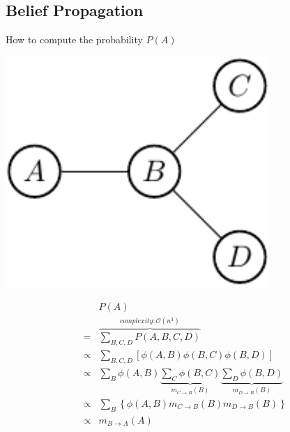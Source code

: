 \subsection{Belief Propagation}

How to compute the probability $P(A)$

\begin{minipage}[c]{0.4\textwidth}
      \centering
      \includegraphics[width=0.75\textwidth]{./Figures/message_passing}
\end{minipage}
\begin{minipage}[c]{0.6\textwidth}
 \begin{equation*}
  \begin{array}{rcl}
  & & P(A) \\
  &=& \overbrace{\sum_{B,C,D}P(A,B,C,D)}^{complexity:  \mathcal{O}(n^{3})} \\
  &\propto& \sum_{B,C,D} \left[ \phi(A,B) \phi(B,C) \phi(B,D) \right] \\
  &\propto& \sum_{B}\phi(A,B) \underbrace{\sum_C \phi(B,C)}_{m_{C\rightarrow B}(B)} \underbrace{\sum_D \phi(B,D)}_{m_{D\rightarrow B}(B)}\\ 
  &\propto& \sum_{B} \left\{\phi(A,B) m_{C\rightarrow B}(B) m_{D\rightarrow B}(B) \right\} \\
  &\propto& m_{B\rightarrow A}(A)
  \end{array}
 \end{equation*}
\end{minipage}

